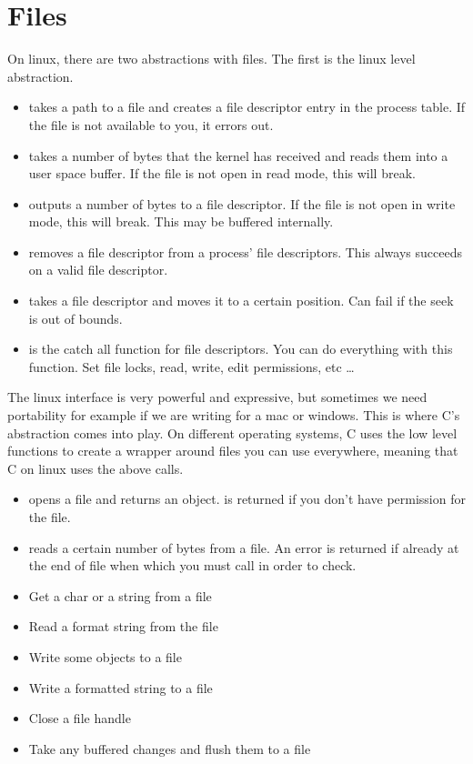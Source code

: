 \section{Files}

On linux, there are two abstractions with files. The first is the linux  level abstraction.

 \begin{itemize}
\item {} takes a path to a file and creates a file descriptor entry in the process table. If the file is not available to you, it errors out.
\item {} takes a number of bytes that the kernel has received and reads them into a user space buffer. If the file is not open in read mode, this will break.
\item {} outputs a number of bytes to a file descriptor. If the file is not open in write mode, this will break. This may be buffered internally.
\item {} removes a file descriptor from a process' file descriptors. This always succeeds on a valid file descriptor.
\item {} takes a file descriptor and moves it to a certain position. Can fail if the seek is out of bounds.
\item {} is the catch all function for file descriptors. You can do everything with this function. Set file locks, read, write, edit permissions, etc \ldots{}
 \end{itemize}

The linux interface is very powerful and expressive, but sometimes we need portability for example if we are writing for a mac or windows.
This is where C's abstraction comes into play.
On different operating systems, C uses the low level functions to create a wrapper around files you can use everywhere, meaning that C on linux uses the above calls.

\begin{itemize}
\item {} opens a file and returns an object.  is returned if you don't have permission for the file.
\item {} reads a certain number of bytes from a file. An error is returned if already at the end of file when which you must call  in order to check.
\item {} Get a char or a string from a file
\item {} Read a format string from the file
\item {} Write some objects to a file
\item {} Write a formatted string to a file
\item {} Close a file handle
\item {} Take any buffered changes and flush them to a file
\end{itemize}

